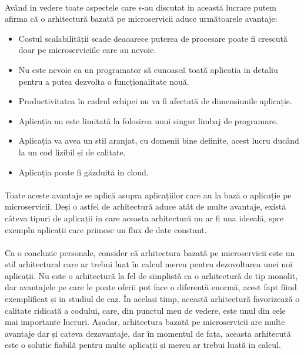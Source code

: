 \documentclass[12pt]{report}
\begin{document}
\paragraph{}Având in vedere toate aspectele care s-au discutat in această lucrare putem afirma că o arhitectură bazată pe microservicii aduce următoarele avantaje:
\begin{itemize}
\item Costul scalabilității scade deaoarece puterea de procesare poate fi crescută doar pe microserviciile care au nevoie.
\item Nu este nevoie ca un programator să cunoască toată aplicația in detaliu pentru a putea dezvolta o funcționalitate nouă.
\item Productivitatea în cadrul echipei nu va fi afectată de dimensiunile aplicație.
\item Aplicația nu este limitată la folosirea unui singur limbaj de programare.
\item Aplicația va avea un stil aranjat, cu domenii bine definite, acest lucru ducând la un cod lizibil și de calitate.
\item Aplicația poate fi găzduită in cloud.
\end{itemize}
\paragraph{}Toate aceste avantaje se aplică asupra aplicațiilor care au la bază o aplicație pe microservicii. Deși o astfel de arhitectură aduce atât de multe avantaje, există câteva tipuri de aplicații in care aceasta arhitectură nu ar fi una ideeală, spre exemplu aplicații care primesc un flux de date constant.
\paragraph{}Ca o concluzie personale, consider că arhitectura bazată pe microservicii este un stil arhitectural care ar trebui luat în calcul mereu pentru dezovoltarea unei noi aplicații. Nu este o arhitectură la fel de simplistă ca o arhitectură de tip monolit, dar avantajele pe care le poate oferii pot face o diferență enormă, acest fapt fiind exemplificat și in studiul de caz. În același timp, această arhitectură favorizează o calitate ridicată a codului, care, din punctul meu de vedere, este unul din cele mai importante lucruri. Așadar, arhitectura bazată pe microservicii are multe avantaje dar și cateva dezavantaje, dar în momentul de fața, aceasta arhitecută este o solutie fiabilă pentru multe aplicații și mereu ar trebui luată in calcul. 


\end{document}
